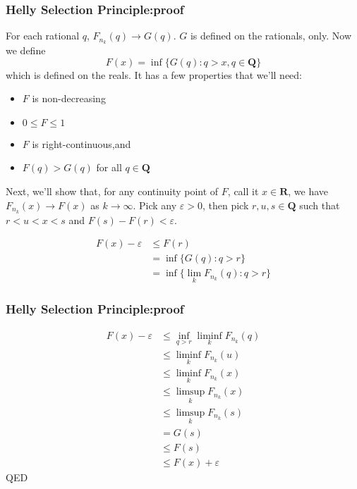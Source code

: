 \documentclass[handout]{beamer}
\begin{document}
\frame
{
\frametitle{Helly Selection Principle:proof} 

For each rational $q$, $F_{n_k}(q) \to  G(q)$. $G$ is defined on the rationals, only. Now we define 
$$
F(x) = \inf\{ G(q) : q > x, q \in \mathbf{Q} \}
$$
which is defined on the reals. It has a few properties that we'll need:

\begin{itemize}
\item $F$ is non-decreasing
\item $0 \le F \le 1$
\item $F$ is right-continuous,and
\item $F(q) > G(q)$ for all $q \in \mathbf{Q}$
\end{itemize}

Next, we'll show that, for any continuity point of $F$, call it $x \in \mathbf{R}$, we have $F_{n_k}(x) \to F(x)$ as $k \to \infty$. Pick any $\varepsilon > 0$, then pick $r,u,s \in \mathbf{Q}$ such that $r < u < x < s$ and $F(s) - F(r) < \varepsilon$.

\begin{align*}
F(x) - \varepsilon &\le F(r) \\
&= \inf\{ G(q) : q > r\} \\
&= \inf\{ \lim_{k} F_{n_k}(q) : q > r\} 
\end{align*}
}


\frame
{
\frametitle{Helly Selection Principle:proof} 


\begin{align*}
F(x) - \varepsilon &\le \inf_{q > r} \liminf_{k} F_{n_k}(q) \\
&\le \liminf_{k} F_{n_k}(u) \tag{$u > r$} \\
&\le \liminf_{k} F_{n_k}(x) \tag{$x > u$ } \\
&\le \limsup_{k} F_{n_k}(x)  \\
&\le \limsup_{k} F_{n_k}(s) \tag{$s > x$ } \\
&= G(s) \\
&\le F(s) \\
&\le F(x) + \varepsilon 
\end{align*}
QED
}
\end{document}
